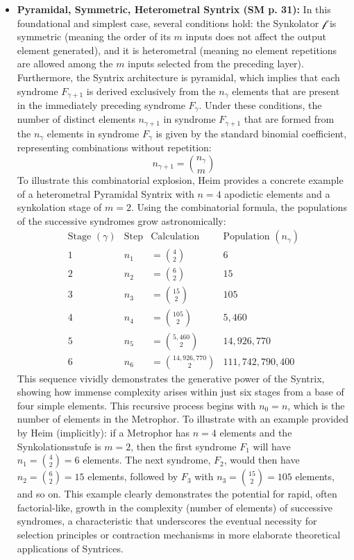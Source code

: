 \documentclass[12pt]{article}
\newcommand{\synkolator}{\mathcal{f}}
\newcommand{\synkolationsstufe}{m}
\newcommand{\syndrom}{F}
\begin{document}
\begin{itemize}
    \item \textbf{Pyramidal, Symmetric, Heterometral Syntrix (SM p. 31):}
    In this foundational and simplest case, several conditions hold: the Synkolator \( \synkolator \) is symmetric (meaning the order of its \( \synkolationsstufe \) inputs does not affect the output element generated), and it is heterometral (meaning no element repetitions are allowed among the \( \synkolationsstufe \) inputs selected from the preceding layer). Furthermore, the Syntrix architecture is pyramidal, which implies that each syndrome \( \syndrom_{\gamma+1} \) is derived exclusively from the \( n_\gamma \) elements that are present in the immediately preceding syndrome \( \syndrom_\gamma \). Under these conditions, the number of distinct elements \( n_{\gamma+1} \) in syndrome \( \syndrom_{\gamma+1} \) that are formed from the \( n_\gamma \) elements in syndrome \( \syndrom_\gamma \) is given by the standard binomial coefficient, representing combinations without repetition:
    \begin{equation*}
    n_{\gamma+1} = \binom{n_\gamma}{\synkolationsstufe}
    \end{equation*}
    To illustrate this combinatorial explosion, Heim provides a concrete example of a heterometral Pyramidal Syntrix with $n = 4$ apodictic elements and a synkolation stage of $m = 2$. Using the combinatorial formula, the populations of the successive syndromes grow astronomically:
\[
\renewcommand{\arraystretch}{1.3}
\begin{array}{rccr}
\text{Stage } (\gamma) & \text{Step} & \text{Calculation} & \text{Population } (n_\gamma) \\ \hline
1 & n_1 & = \binom{4}{2} & 6 \\
2 & n_2 & = \binom{6}{2} & 15 \\
3 & n_3 & = \binom{15}{2} & 105 \\
4 & n_4 & = \binom{105}{2} & 5{,}460 \\
5 & n_5 & = \binom{5{,}460}{2} & 14{,}926{,}770 \\
6 & n_6 & = \binom{14{,}926{,}770}{2} & 111{,}742{,}790{,}400
\end{array}
\]
This sequence vividly demonstrates the generative power of the Syntrix, showing how immense complexity arises within just six stages from a base of four simple elements.
    This recursive process begins with \( n_0 = n \), which is the number of elements in the Metrophor. To illustrate with an example provided by Heim (implicitly): if a Metrophor has \( n=4 \) elements and the Synkolationsstufe is \( \synkolationsstufe=2 \), then the first syndrome \( \syndrom_1 \) will have \( n_1 = \binom{4}{2}=6 \) elements. The next syndrome, \( \syndrom_2 \), would then have \( n_2 = \binom{6}{2}=15 \) elements, followed by \( \syndrom_3 \) with \( n_3 = \binom{15}{2}=105 \) elements, and so on. This example clearly demonstrates the potential for rapid, often factorial-like, growth in the complexity (number of elements) of successive syndromes, a characteristic that underscores the eventual necessity for selection principles or contraction mechanisms in more elaborate theoretical applications of Syntrices.


\end{itemize}
\end{document}
